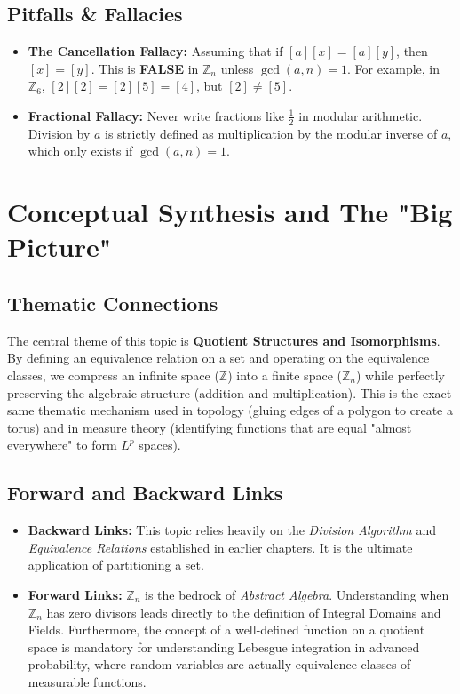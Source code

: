 \documentclass[11pt, a4paper]{article}
\theoremstyle{definition}
\theoremstyle{remark}
\newcommand{\Z}{\mathbb{Z}}
\begin{document}
\subsection{Pitfalls \& Fallacies}
\begin{itemize}
    \item \textbf{The Cancellation Fallacy:} Assuming that if $[a][x] = [a][y]$, then $[x] = [y]$. This is \textbf{FALSE} in $\Z_n$ unless $\gcd(a, n) = 1$. For example, in $\Z_6$, $[2][2] = [2][5] = [4]$, but $[2] \neq [5]$.
    \item \textbf{Fractional Fallacy:} Never write fractions like $\frac{1}{2}$ in modular arithmetic. Division by $a$ is strictly defined as multiplication by the modular inverse of $a$, which only exists if $\gcd(a, n) = 1$.
\end{itemize}

\newpage
\section{Conceptual Synthesis and The "Big Picture"}

\subsection{Thematic Connections}
The central theme of this topic is \textbf{Quotient Structures and Isomorphisms}. By defining an equivalence relation on a set and operating on the equivalence classes, we compress an infinite space ($\Z$) into a finite space ($\Z_n$) while perfectly preserving the algebraic structure (addition and multiplication). This is the exact same thematic mechanism used in topology (gluing edges of a polygon to create a torus) and in measure theory (identifying functions that are equal "almost everywhere" to form $L^p$ spaces).

\subsection{Forward and Backward Links}
\begin{itemize}
    \item \textbf{Backward Links:} This topic relies heavily on the \textit{Division Algorithm} and \textit{Equivalence Relations} established in earlier chapters. It is the ultimate application of partitioning a set.
    \item \textbf{Forward Links:} $\Z_n$ is the bedrock of \textit{Abstract Algebra}. Understanding when $\Z_n$ has zero divisors leads directly to the definition of Integral Domains and Fields. Furthermore, the concept of a well-defined function on a quotient space is mandatory for understanding Lebesgue integration in advanced probability, where random variables are actually equivalence classes of measurable functions.
\end{itemize}
\end{document}
